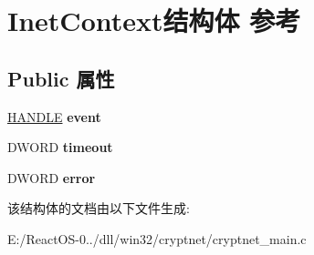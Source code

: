\hypertarget{struct_inet_context}{}\section{Inet\+Context结构体 参考}
\label{struct_inet_context}
\subsection*{Public 属性}
\begin{DoxyCompactItemize}
\item 
\mbox{\label{struct_inet_context_af8c1e69e8f0d947578fe367052103138}} 
\hyperlink{interfacevoid}{H\+A\+N\+D\+LE} {\bfseries event}
\item 
\mbox{\label{struct_inet_context_ad764e0e1e35627f0908282bada0a0874}} 
D\+W\+O\+RD {\bfseries timeout}
\item 
\mbox{\label{struct_inet_context_a40e6051e1e8b9d42deb6c524b6a2a3ff}} 
D\+W\+O\+RD {\bfseries error}
\end{DoxyCompactItemize}


该结构体的文档由以下文件生成\+:\begin{DoxyCompactItemize}
\item 
E\+:/\+React\+O\+S-\/0../dll/win32/cryptnet/cryptnet\+\_\+main.\+c\end{DoxyCompactItemize}
